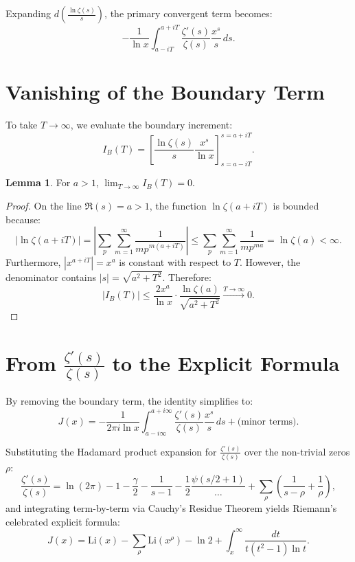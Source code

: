 \documentclass[11pt,a4paper]{article}
\theoremstyle{definition}
\newtheorem{lemma}{Lemma}
\begin{document}
	Expanding $d\left( \frac{\ln \zeta(s)}{s} \right)$, the primary convergent term becomes:
	\begin{equation}
		-\frac{1}{\ln x} \int_{a - iT}^{a + iT} \frac{\zeta'(s)}{\zeta(s)} \frac{x^s}{s} \, ds.
	\end{equation}
	
	\section{Vanishing of the Boundary Term}
	
	To take $T \to \infty$, we evaluate the boundary increment:
	\begin{equation}
		I_B(T) = \left[ \frac{\ln \zeta(s)}{s} \frac{x^s}{\ln x} \right]_{s = a - iT}^{s = a + iT}.
	\end{equation}
	
	\begin{lemma}
		For $a > 1$, $\lim_{T \to \infty} I_B(T) = 0$.
	\end{lemma}
	
	\begin{proof}
		On the line $\Re(s) = a > 1$, the function $\ln \zeta(a + iT)$ is bounded because:
		\[
		|\ln \zeta(a + iT)| = \left| \sum_{p} \sum_{m=1}^{\infty} \frac{1}{m p^{m(a + iT)}} \right| \le \sum_{p} \sum_{m=1}^{\infty} \frac{1}{m p^{ma}} = \ln \zeta(a) < \infty.
		\]
		Furthermore, $|x^{a + iT}| = x^a$ is constant with respect to $T$. However, the denominator contains $|s| = \sqrt{a^2 + T^2}$. Therefore:
		\[
		|I_B(T)| \le \frac{2 x^a}{\ln x} \cdot \frac{\ln \zeta(a)}{\sqrt{a^2 + T^2}} \xrightarrow{T \to \infty} 0.
		\]
	\end{proof}
	
	\section{From $\frac{\zeta'(s)}{\zeta(s)}$ to the Explicit Formula}
	
	By removing the boundary term, the identity simplifies to:
	\begin{equation}
		J(x) = -\frac{1}{2\pi i \ln x} \int_{a - i\infty}^{a + i\infty} \frac{\zeta'(s)}{\zeta(s)} \frac{x^s}{s} \, ds + \text{(minor terms)}.
	\end{equation}
	
	Substituting the Hadamard product expansion for $\frac{\zeta'(s)}{\zeta(s)}$ over the non-trivial zeros $\rho$:
	\begin{equation}
		\frac{\zeta'(s)}{\zeta(s)} = \ln(2\pi) - 1 - \frac{\gamma}{2} - \frac{1}{s-1} - \frac{1}{2}\frac{\psi(s/2 + 1)}{\dots} + \sum_{\rho} \left( \frac{1}{s - \rho} + \frac{1}{\rho} \right),
	\end{equation}
	and integrating term-by-term via Cauchy's Residue Theorem yields Riemann's celebrated explicit formula:
	\begin{equation}
		J(x) = \mathrm{Li}(x) - \sum_{\rho} \mathrm{Li}(x^\rho) - \ln 2 + \int_{x}^{\infty} \frac{dt}{t(t^2 - 1) \ln t}.
	\end{equation}
	
\end{document}
